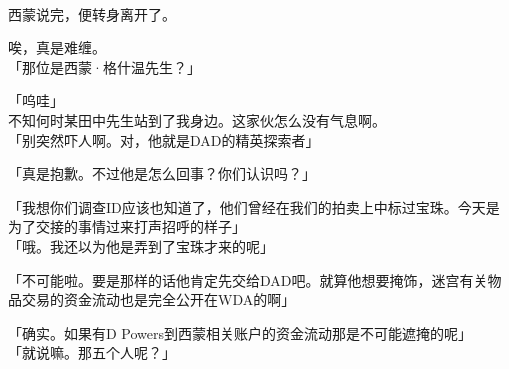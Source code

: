 
\\

西蒙说完，便转身离开了。

唉，真是难缠。\\

「那位是西蒙·格什温先生？」

「呜哇」\\

不知何时某田中先生站到了我身边。这家伙怎么没有气息啊。\\

「别突然吓人啊。对，他就是DAD的精英探索者」

「真是抱歉。不过他是怎么回事？你们认识吗？」

「我想你们调查ID应该也知道了，他们曾经在我们的拍卖上中标过宝珠。今天是为了交接的事情过来打声招呼的样子」\\

「哦。我还以为他是弄到了宝珠才来的呢」

「不可能啦。要是那样的话他肯定先交给DAD吧。就算他想要掩饰，迷宫有关物品交易的资金流动也是完全公开在WDA的啊」

「确实。如果有D Powers到西蒙相关账户的资金流动那是不可能遮掩的呢」\\

「就说嘛。那五个人呢？」

